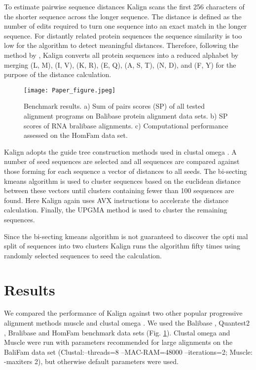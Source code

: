 \documentclass[nocrop]{bioinfo}
\begin{document}
To estimate pairwise sequence distances Kalign scans the first 256 characters of the shorter sequence across the longer sequence. The distance is defined as the number of edits required to turn one sequence into an exact match in the longer sequence. For distantly related protein sequences the sequence similarity is too low for the algorithm to detect meaningful distances. Therefore, following the method by \cite{steinegger2018clustering}, Kalign converts all protein sequences into a reduced alphabet by merging (L, M), (I, V), (K, R), (E, Q), (A, S, T), (N, D), and (F, Y) for the purpose of the distance calculation. 

\begin{figure}[!tpb]%
  \centerline{\texttt{[image: Paper\_figure.jpeg]}}
  \caption{Benchmark results. a) Sum of pairs scores (SP) of all tested alignment programs on Balibase protein alignment data sets. b) SP scores of RNA bralibase alignments. c) Computational performance assessed on the {\color{red}Hom}Fam data set.}\label{fig:01}
\end{figure}

Kalign adopts the guide tree construction methods used in clustal omega \citep{sievers2011fast}. A number of seed sequences are selected and all sequences are compared against those forming for each sequence a vector of distances to all seeds. The bi-secting kmeans algorithm is used to cluster sequences based on the euclidean distance between these vectors until clusters containing fewer than 100 sequences are found. Here Kalign again uses AVX instructions to accelerate the distance calculation. Finally, the UPGMA method is used to cluster the remaining sequences.

Since the bi-secting kmeans algorithm is not guaranteed to discover the opti{\color{red} mal} split of sequence{\color{red}s} into two clusters Kalign runs the algorithm {\color{red}fifty} times using randomly selected sequences to seed the calculation. 

\section{Results}
We compared the performance of Kalign against two other popular progressive alignment methods muscle \citep{edgar2004muscle} and clustal omega \citep{sievers2011fast}. We used the Balibase \citep{thompson1999balibase}, Quantest2 \citep{sievers2019quantest2}, Bralibase \citep{gardner2005benchmark} and {\color{red}Hom}Fam benchmark data sets (Fig. \ref{fig:01}). Clustal omega and Muscle were run with parameters recommended for large alignments on the BaliFam data set (Clustal:--threads=8 --MAC-RAM=48000 --iterations=2; Muscle:  -maxiters 2), but otherwise default parameters were used.
\end{document}

